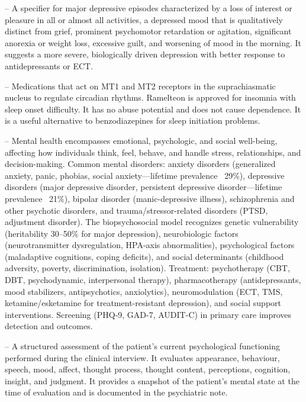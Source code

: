 -- A specifier for major depressive episodes characterized by a loss of interest or pleasure in all or almost all activities, a depressed mood that is qualitatively distinct from grief, prominent psychomotor retardation or agitation, significant anorexia or weight loss, excessive guilt, and worsening of mood in the morning. It suggests a more severe, biologically driven depression with better response to antidepressants or ECT.

-- Medications that act on MT1 and MT2 receptors in the suprachiasmatic nucleus to regulate circadian rhythms. Ramelteon is approved for insomnia with sleep onset difficulty. It has no abuse potential and does not cause dependence. It is a useful alternative to benzodiazepines for sleep initiation problems.

-- Mental health encompasses emotional, psychologic, and social well-being, affecting how individuals think, feel, behave, and handle stress, relationships, and decision-making. Common mental disorders: anxiety disorders (generalized anxiety, panic, phobias, social anxiety—lifetime prevalence ~29\%), depressive disorders (major depressive disorder, persistent depressive disorder—lifetime prevalence ~21\%), bipolar disorder (manic-depressive illness), schizophrenia and other psychotic disorders, and trauma/stressor-related disorders (PTSD, adjustment disorder). The biopsychosocial model recognizes genetic vulnerability (heritability 30--50\% for major depression), neurobiologic factors (neurotransmitter dysregulation, HPA-axis abnormalities), psychological factors (maladaptive cognitions, coping deficits), and social determinants (childhood adversity, poverty, discrimination, isolation). Treatment: psychotherapy (CBT, DBT, psychodynamic, interpersonal therapy), pharmacotherapy (antidepressants, mood stabilizers, antipsychotics, anxiolytics), neuromodulation (ECT, TMS, ketamine/esketamine for treatment-resistant depression), and social support interventions. Screening (PHQ-9, GAD-7, AUDIT-C) in primary care improves detection and outcomes.

-- A structured assessment of the patient's current psychological functioning performed during the clinical interview. It evaluates appearance, behaviour, speech, mood, affect, thought process, thought content, perceptions, cognition, insight, and judgment. It provides a snapshot of the patient's mental state at the time of evaluation and is documented in the psychiatric note.


